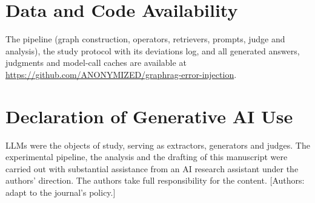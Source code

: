 \documentclass[11pt]{article}
\begin{document}
\section*{Data and Code Availability}
The pipeline (graph construction, operators, retrievers, prompts, judge and analysis), the study protocol with its deviations log, and all generated answers, judgments and model-call caches are available at \url{https://github.com/ANONYMIZED/graphrag-error-injection}.

\section*{Declaration of Generative AI Use}
LLMs were the objects of study, serving as extractors, generators and judges. The experimental pipeline, the analysis and the drafting of this manuscript were carried out with substantial assistance from an AI research assistant under the authors' direction. The authors take full responsibility for the content. [Authors: adapt to the journal's policy.]



\end{document}
